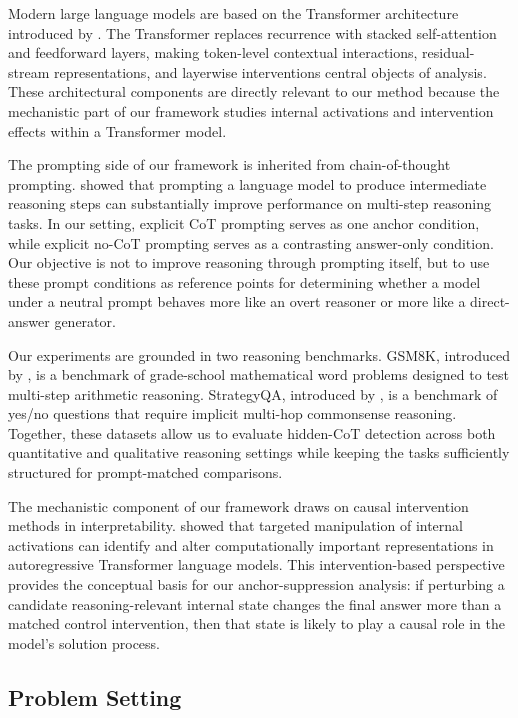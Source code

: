 \documentclass{article}
\theoremstyle{plain}
\theoremstyle{definition}
\theoremstyle{remark}
\begin{document}
Modern large language models are based on the Transformer architecture introduced by \citet{vaswani_attention_2023}. The Transformer replaces recurrence with stacked self-attention and feedforward layers, making token-level contextual interactions, residual-stream representations, and layerwise interventions central objects of analysis. These architectural components are directly relevant to our method because the mechanistic part of our framework studies internal activations and intervention effects within a Transformer model.

The prompting side of our framework is inherited from chain-of-thought prompting. \citet{wei_chain--thought_2023} showed that prompting a language model to produce intermediate reasoning steps can substantially improve performance on multi-step reasoning tasks. In our setting, explicit CoT prompting serves as one anchor condition, while explicit no-CoT prompting serves as a contrasting answer-only condition. Our objective is not to improve reasoning through prompting itself, but to use these prompt conditions as reference points for determining whether a model under a neutral prompt behaves more like an overt reasoner or more like a direct-answer generator.

Our experiments are grounded in two reasoning benchmarks. GSM8K, introduced by \citet{cobbe_training_2021}, is a benchmark of grade-school mathematical word problems designed to test multi-step arithmetic reasoning. StrategyQA, introduced by \citet{geva_did_2021}, is a benchmark of yes/no questions that require implicit multi-hop commonsense reasoning. Together, these datasets allow us to evaluate hidden-CoT detection across both quantitative and qualitative reasoning settings while keeping the tasks sufficiently structured for prompt-matched comparisons.

The mechanistic component of our framework draws on causal intervention methods in interpretability. \citet{meng_locating_2023} showed that targeted manipulation of internal activations can identify and alter computationally important representations in autoregressive Transformer language models. This intervention-based perspective provides the conceptual basis for our anchor-suppression analysis: if perturbing a candidate reasoning-relevant internal state changes the final answer more than a matched control intervention, then that state is likely to play a causal role in the model's solution process.

\subsection{Problem Setting}
\end{document}
